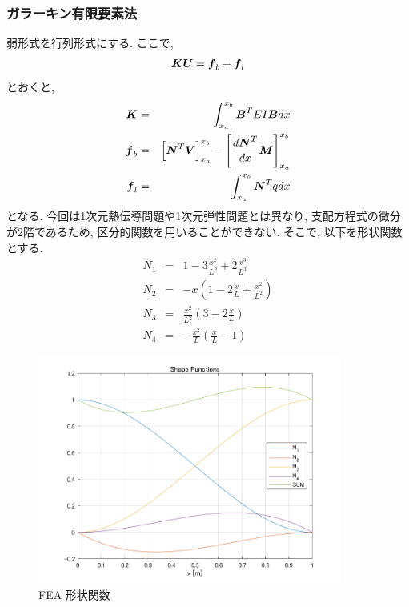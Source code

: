 \documentclass{jsarticle}
\begin{document}
\subsubsection{ガラーキン有限要素法}
弱形式を行列形式にする. ここで,
\begin{eqnarray*}
\mbox{\boldmath $K$}\mbox{\boldmath $U$}=\mbox{\boldmath $f$}_b+\mbox{\boldmath $f$}_l
\end{eqnarray*}
とおくと,
\begin{eqnarray*}
\mbox{\boldmath $K$} &=& \int^{x_b}_{x_a}\mbox{\boldmath $B$}^TEI\mbox{\boldmath $B$}dx \\
\mbox{\boldmath $f$}_b &=& \left[\mbox{\boldmath $N$}^T\mbox{\boldmath $V$}\right]^{x_b}_{x_a}-\left[\frac{d\mbox{\boldmath $N$}^T}{dx}\mbox{\boldmath $M$}\right]^{x_b}_{x_a} \\
\mbox{\boldmath $f$}_l &=& \int^{x_b}_{x_a}\mbox{\boldmath $N$}^Tqdx
\end{eqnarray*}
となる. 今回は1次元熱伝導問題や1次元弾性問題とは異なり, 支配方程式の微分が2階であるため, 区分的関数を用いることができない. そこで, 以下を形状関数とする.
\begin{eqnarray*}
N_1 &=& 1-3\frac{x^2}{L^2}+2\frac{x^3}{L^3} \\
N_2 &=& -x\left(1-2\frac{x}{L}+\frac{x^2}{L^2}\right) \\
N_3 &=& \frac{x^2}{L^2}\left(3-2\frac{x}{L}\right) \\
N_4 &=& -\frac{x^2}{L}\left(\frac{x}{L}-1\right)
\end{eqnarray*}
\begin{figure}[H]
\begin{center}
\includegraphics[width=10cm]{Shape_Functions.png}
\caption{FEA 形状関数}
\end{center}
\end{figure}
\end{document}
